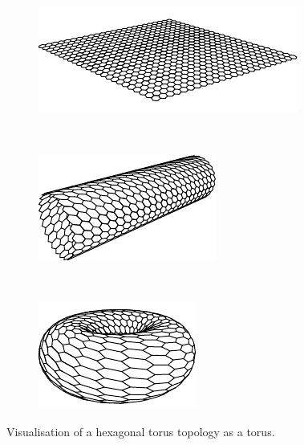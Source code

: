 		\begin{figure}
			\center
			\begin{subfigure}{0.39\linewidth}
				\center
				\includegraphics[width=\linewidth]{figures/torus-3d-flat.pdf}
				\caption{}
				\label{fig:torus-3d-flat}
			\end{subfigure}
			~~
			\begin{subfigure}{0.26\linewidth}
				\center
				\includegraphics[width=\linewidth]{figures/torus-3d-tube.pdf}
				\caption{}
				\label{fig:torus-3d-tube}
			\end{subfigure}
			~~
			\begin{subfigure}{0.23\linewidth}
				\center
				\includegraphics[width=\linewidth]{figures/torus-3d-torus.pdf}
				\caption{}
				\label{fig:torus-3d-torus}
			\end{subfigure}
			
			\caption{Visualisation of a hexagonal torus topology as a torus.}
			\label{fig:torus-3d}
		\end{figure}
		
